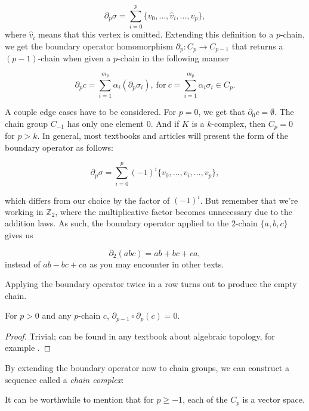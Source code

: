 \begin{equation*}
  \partial_{p}\sigma = \sum_{i=0}^{p}\{v_{0}, \ldots, \hat{v}_{i}, \ldots, v_{p}\},
\end{equation*}
where $\hat{v}_{i}$ means that this vertex is omitted. Extending this definition to a $p$-chain, we get the boundary operator homomorphism $\partial_{p}: C_{p} \to C_{p-1}$ that returns a $(p-1)$-chain when given a $p$-chain in the following manner

\begin{equation*}
  \partial_{p}c = \sum_{i=1}^{m_{p}}\alpha_{i}(\partial_{p}\sigma_{i}), \: \text{for} \: c = \sum_{i=1}^{m_{p}}\alpha_{i}\sigma_{i} \in C_{p}.
\end{equation*}

A couple edge cases have to be considered. For $p = 0$, we get that $\partial_{0}c = \emptyset$. The chain group $C_{-1}$ has only one element $0$. And if $K$ is a $k$-complex, then $C_{p} = 0$ for $p>k$. In general, most textbooks and articles will present the form of the boundary operator as follows:

\begin{equation*}
  \partial_{p}\sigma = \sum_{i=0}^{p}(-1)^{i} \{v_{0}, \ldots, \hat{v}_{i}, \ldots, v_{p}\},
\end{equation*}

which differs from our choice by the factor of $(-1)^{i}$. But remember that we're working in $\mathbb{Z}_{2}$, where the multiplicative factor becomes unnecessary due to the addition laws. As such, the boundary operator applied to the $2$-chain $\{a,b,c\}$ gives us

\begin{equation*}
  \partial_{2}(abc) = ab + bc + ca,
\end{equation*}
instead of $ab - bc + ca$ as you may encounter in other texts.

Applying the boundary operator twice in a row turns out to produce the empty chain.

\begin{lemma}
  For $p>0$ and any $p$-chain $c$, $\partial_{p-1}\circ\partial_{p}(c) = 0$.
\end{lemma}

\begin{proof}
Trivial; can be found in any textbook about algebraic topology, for example \cite{hatcher2002algebraic}.
\end{proof}

By extending the boundary operator now to chain groups, we can construct a sequence called a \textit{chain complex}:

\begin{figure}[h]
\end{figure}
It can be worthwhile to mention that for $p \geq -1$, each of the $C_{p}$ is a vector space.

